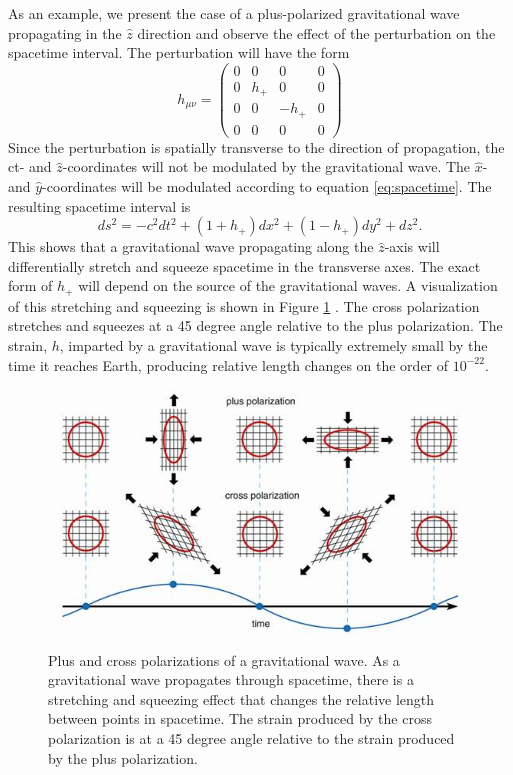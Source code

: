 As an example, we present the case of a plus-polarized gravitational wave 
propagating in the $\hat{z}$ direction and observe the effect of the perturbation 
on the spacetime interval. The perturbation will have the form 
\begin{equation}
h_{\mu\nu} = 
  \begin{pmatrix}
    0 & 0 & 0 & 0 \\
    0 & h_+ & 0 & 0 \\
    0 & 0 & -h_+ & 0 \\
    0 & 0 & 0 & 0
  \end{pmatrix}
\end{equation}
Since the perturbation is spatially transverse to the direction of 
propagation, the ct- and $\hat{z}$-coordinates will not be modulated by the 
gravitational wave. The $\hat{x}$- and $\hat{y}$-coordinates will be modulated  
according to equation \ref{eq:spacetime}. The resulting spacetime 
interval is
\begin{equation}
ds^2 = -c^2 dt^2 + (1 + h_+)dx^2 + (1 - h_+)dy^2 + dz^2.
\end{equation}
This shows that a gravitational wave propagating along the $\hat{z}$-axis 
will differentially stretch and squeeze spacetime in the transverse 
axes. The exact form of $h_+$ will depend on the source of the 
gravitational waves. A visualization of this stretching and squeezing 
is shown in Figure \ref{fig:polarizations} \cite{Polarization}. The cross polarization  
stretches and squeezes at a 45 degree angle relative to the plus 
polarization. The strain, $h$, imparted by a gravitational wave is 
typically extremely small by the time it reaches Earth, producing 
relative length changes on the order of $10^{-22}$. 

\begin{figure}[ht!]
\includegraphics[width=\textwidth]{figures/introduction/polarisations2}
\caption[Plus and cross polarizations]{Plus and cross polarizations %
         of a gravitational wave. As a gravitational wave propagates through spacetime, %
         there is a stretching and squeezing effect that changes the relative length between %
         points in spacetime. The strain produced by the cross polarization %
         is at a 45 degree angle relative to the strain produced by the plus %
         polarization. }
\label{fig:polarizations}
\end{figure}

